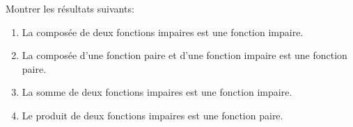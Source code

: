 
\begin{exercice}  \;
Montrer les r\'esultats suivants:
\begin{enumerate}
\item La compos\'ee de deux fonctions impaires est une fonction impaire. 
\item La compos\'ee d'une fonction paire et d'une fonction impaire est une fonction paire.
\item La somme de deux fonctions impaires est une fonction impaire.
\item Le produit de deux fonctions impaires est une fonction paire.
\end{enumerate}
\end{exercice}